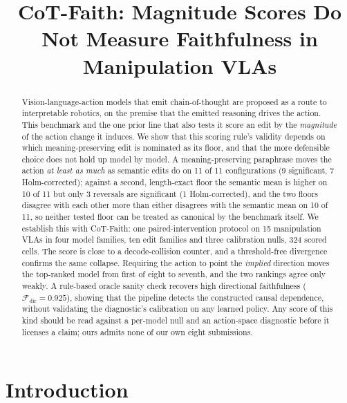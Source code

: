 \documentclass{article}
\title{CoT-Faith: Magnitude Scores Do Not Measure Faithfulness in Manipulation VLAs}
\author{}
\date{}
\begin{document}
\maketitle

\begin{abstract}
Vision-language-action models that emit chain-of-thought are proposed as a route to interpretable robotics, on the premise that the emitted reasoning drives the action. This benchmark and the one prior line that also tests it score an edit by the \emph{magnitude} of the action change it induces. We show that this scoring rule's validity depends on which meaning-preserving edit is nominated as its floor, and that the more defensible choice does not hold up model by model. A meaning-preserving paraphrase moves the action \emph{at least as much} as semantic edits do on 11 of 11 configurations (9 significant, 7 Holm-corrected); against a second, length-exact floor the semantic mean is higher on 10 of 11 but only 3 reversals are significant (1 Holm-corrected), and the two floors disagree with each other more than either disagrees with the semantic mean on 10 of 11, so neither tested floor can be treated as canonical by the benchmark itself. We establish this with CoT-Faith: one paired-intervention protocol on 15 manipulation VLAs in four model families, ten edit families and three calibration nulls, 324 scored cells. The score is close to a decode-collision counter, and a threshold-free divergence confirms the same collapse. Requiring the action to point the \emph{implied} direction moves the top-ranked model from first of eight to seventh, and the two rankings agree only weakly. A rule-based oracle sanity check recovers high directional faithfulness ($\mathcal{F}_{\text{dir}}=0.925$), showing that the pipeline detects the constructed causal dependence, without validating the diagnostic's calibration on any learned policy. Any score of this kind should be read against a per-model null and an action-space diagnostic before it licenses a claim; ours admits none of our own eight submissions.
\end{abstract}

\section{Introduction}
\label{sec:intro}
\end{document}
